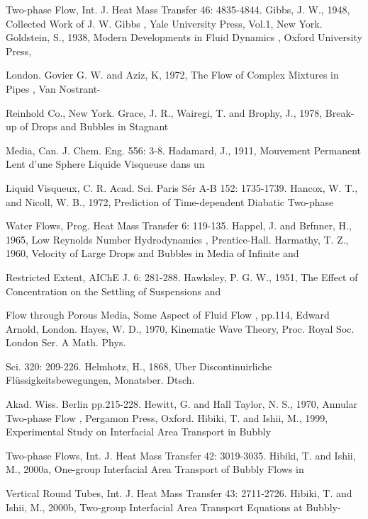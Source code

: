 \documentclass[11pt,a4paper,openany,fontset=none]{ctexbook}
\begin{document}
{\small\raggedright\noindent Two-phase Flow, Int. J. Heat Mass Transfer 46: 4835-4844. Gibbs, J. W., 1948, Collected Work of J. W. Gibbs , Yale University Press, Vol.1, New York. Goldstein, S., 1938, Modern Developments in Fluid Dynamics , Oxford University Press,\par}
{\small\raggedright\noindent London. Govier G. W. and Aziz, K, 1972, The Flow of Complex Mixtures in Pipes , Van Nostrant-\par}
{\small\raggedright\noindent Reinhold Co., New York. Grace, J. R., Wairegi, T. and Brophy, J., 1978, Break-up of Drops and Bubbles in Stagnant\par}
{\small\raggedright\noindent Media, Can. J. Chem. Eng. 556: 3-8. Hadamard, J., 1911, Mouvement Permanent Lent d’une Sphere Liquide Visqueuse dans un\par}
{\small\raggedright\noindent Liquid Visqueux, C. R. Acad. Sci. Paris Sér A-B 152: 1735-1739. Hancox, W. T., and Nicoll, W. B., 1972, Prediction of Time-dependent Diabatic Two-phase\par}
{\small\raggedright\noindent Water Flows, Prog. Heat Mass Transfer 6: 119-135. Happel, J. and Brfnner, H., 1965, Low Reynolds Number Hydrodynamics , Prentice-Hall. Harmathy, T. Z., 1960, Velocity of Large Drops and Bubbles in Media of Infinite and\par}
{\small\raggedright\noindent Restricted Extent, AIChE J. 6: 281-288. Hawksley, P. G. W., 1951, The Effect of Concentration on the Settling of Suspensions and\par}
{\small\raggedright\noindent Flow through Porous Media, Some Aspect of Fluid Flow , pp.114, Edward Arnold, London. Hayes, W. D., 1970, Kinematic Wave Theory, Proc. Royal Soc. London Ser. A Math. Phys.\par}
{\small\raggedright\noindent Sci. 320: 209-226. Helmhotz, H., 1868, Uber Discontinuirliche Flüssigkeitsbewegungen, Monatsber. Dtsch.\par}
{\small\raggedright\noindent Akad. Wiss. Berlin pp.215-228. Hewitt, G. and Hall Taylor, N. S., 1970, Annular Two-phase Flow , Pergamon Press, Oxford. Hibiki, T. and Ishii, M., 1999, Experimental Study on Interfacial Area Transport in Bubbly\par}
{\small\raggedright\noindent Two-phase Flows, Int. J. Heat Mass Transfer 42: 3019-3035. Hibiki, T. and Ishii, M., 2000a, One-group Interfacial Area Transport of Bubbly Flows in\par}
{\small\raggedright\noindent Vertical Round Tubes, Int. J. Heat Mass Transfer 43: 2711-2726. Hibiki, T. and Ishii, M., 2000b, Two-group Interfacial Area Transport Equations at Bubbly-\par}
\end{document}
